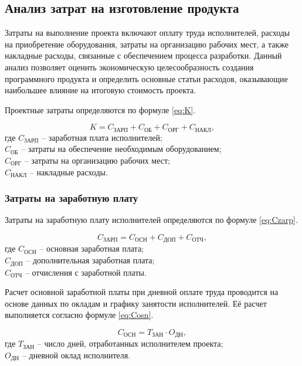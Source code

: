 \subsection{Анализ затрат на изготовление продукта}

Затраты на выполнение проекта включают оплату труда исполнителей, расходы на приобретение оборудования, затраты на организацию рабочих мест, а также накладные расходы, связанные с обеспечением процесса разработки. Данный анализ позволяет оценить экономическую целесообразность создания программного продукта и определить основные статьи расходов, оказывающие наибольшее влияние на итоговую стоимость проекта.

Проектные затраты определяются по формуле \eqref{eq:K}.

\begin{equation}\label{eq:K}
K = C_{\text{ЗАРП}} + C_{\text{ОБ}} + C_{\text{ОРГ}} + C_{\text{НАКЛ}},
\end{equation}
где $C_{\text{ЗАРП}}$ -- заработная плата исполнителей; \\ $C_{\text{ОБ}}$ -- затраты на обеспечение необходимым оборудованием; \\ $C_{\text{ОРГ}}$ -- затраты на организацию рабочих мест; \\ $C_{\text{НАКЛ}}$ -- накладные расходы.

\subsubsection{Затраты на заработную плату}

Затраты на заработную плату исполнителей определяются по формуле \eqref{eq:Czarp}.

\begin{equation}\label{eq:Czarp}
C_{\text{ЗАРП}} = C_{\text{ОСН}} + C_{\text{ДОП}} + C_{\text{ОТЧ}},
\end{equation}
где $C_{\text{ОСН}}$ -- основная заработная плата; \\ $C_{\text{ДОП}}$ -- дополнительная заработная плата; \\ $C_{\text{ОТЧ}}$ -- отчисления с заработной платы.

Расчет основной заработной платы при дневной оплате труда проводится на основе данных по окладам и графику занятости исполнителей. Её расчет выполняется согласно формуле  \eqref{eq:Cosn}.

\begin{equation}\label{eq:Cosn}
C_{\text{ОСН}} = T_{\text{ЗАН}} \cdot O_{\text{ДН}},
\end{equation}
где $T_{\text{ЗАН}}$ -- число дней, отработанных исполнителем проекта; \\ $O_{\text{ДН}}$ -- дневной оклад исполнителя.

